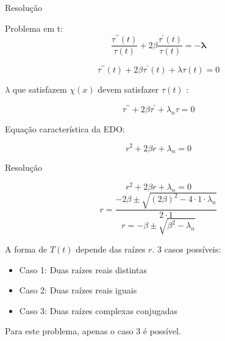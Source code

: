 \documentclass{beamer}
\begin{document}
\begin{frame}{Resolução}

\begin{block}{Problema em t:}
\begin{equation*}
    \dfrac{\tau^{\prime\prime}(t)}{\tau(t)} + 2\beta\dfrac{\tau^{\prime}(t)}{\tau(t)} = - \mathbf{\lambda}
\end{equation*}


\begin{equation*}
    \tau^{\prime\prime}(t)  + 2\beta \tau^{\prime}(t) + \lambda \tau(t) = 0
\end{equation*}

$\lambda$ que satisfazem $\chi (x)$ devem satisfazer  $\tau(t)$ :

\begin{equation}
    \tau^{\prime\prime}  + 2\beta \tau^{\prime} + \lambda_n \tau = 0
\end{equation}

Equação característica da EDO:

\begin{equation}
    r^2+2 \beta r + \lambda_n =  0
\end{equation}

\end{block}

\end{frame}

\begin{frame}{Resolução}

\begin{equation*}
    r^2+2 \beta r + \lambda_n =  0 
\end{equation*}
\begin{equation*}
    r =\dfrac{ -2 \beta \pm \sqrt{(2\beta)^2 - 4 \cdot 1 \cdot \lambda_n}}{2 \cdot 1}
\end{equation*}
\begin{equation*}
    r = -\beta \pm \sqrt{\beta^2 - \lambda_n} 
\end{equation*}


A forma de $T(t)$ depende das raízes $r$. 3 casos possíveis:
\begin{itemize}
    \item Caso 1: Duas raízes reais distintas
    \item Caso 2: Duas raízes reais iguais
    \item Caso 3: Duas raízes complexas conjugadas
\end{itemize}

Para este problema, apenas o caso 3 é possível.

\end{frame}
\end{document}
